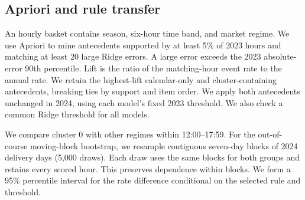 \subsection{Apriori and rule transfer}
An hourly basket contains season, six-hour time band, and market regime.
We use Apriori \cite{apriori} to mine antecedents supported by at least
5\% of 2023 hours and matching at least 20 large Ridge errors.
A large error exceeds the 2023 absolute-error 90th percentile.
Lift is the ratio of the matching-hour event rate to the annual rate.
We retain the highest-lift calendar-only and cluster-containing
antecedents, breaking ties by
support and item order. We apply both antecedents unchanged in 2024,
using each model's fixed 2023 threshold. We also check a common Ridge
threshold for all models.

We compare cluster 0 with other regimes within 12:00--17:59.
For the out-of-course moving-block bootstrap, we resample contiguous
seven-day blocks of 2024 delivery days (5,000 draws). Each draw uses
the same blocks for both groups and retains every scored hour.
This preserves dependence within blocks. We form a 95\% percentile
interval for the rate difference conditional on the selected rule
and threshold.
